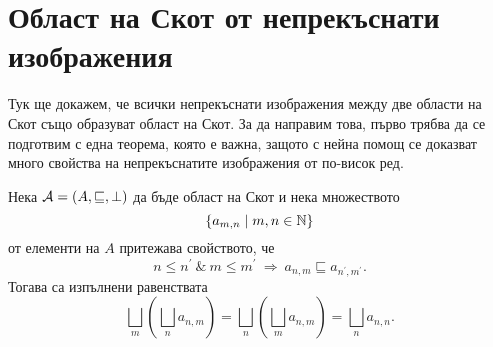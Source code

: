 \section{Област на Скот от непрекъснати изображения}

Тук ще докажем, че всички непрекъснати изображения между две области на Скот също образуват област на Скот. За да направим това, първо трябва да се подготвим с една теорема, която е важна, защото с нейна помощ се доказват много свойства на непрекъснатите изображения от по-висок ред.

\begin{framed}
\begin{theorem}\label{th:double-chain}
  Нека $\mathcal{A} = (A,\sqsubseteq,\bot)$ да бъде област на Скот и нека множеството 
  \[\{a_{m,n} \mid m,n \in \mathbb{N}\}\] от елементи на $A$ притежава свойството, че 
  \[n \leq n^\prime\ \&\ m \leq m^\prime\ \Rightarrow\ a_{n,m} \sqsubseteq a_{n^\prime,m^\prime}.\]
  Тогава са изпълнени равенствата
  \[\bigsqcup_m(\bigsqcup_n a_{n,m}) = \bigsqcup_n(\bigsqcup_{m} a_{n,m}) = \bigsqcup_n a_{n,n}.\]
\end{theorem}
\end{framed}

